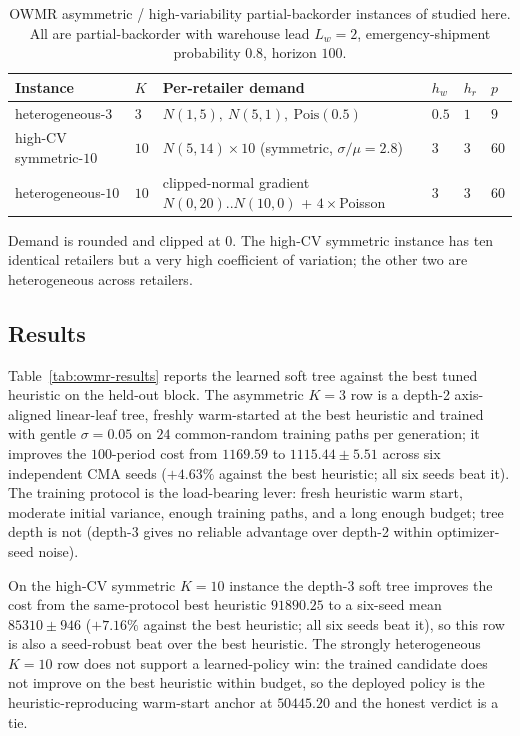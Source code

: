 \documentclass[11pt]{article}
\begin{document}
\begin{table}[!htbp]
\centering
\small
\caption{OWMR asymmetric / high-variability partial-backorder instances of \citet{kaynov2024owmr}
studied here. All are partial-backorder with warehouse lead $L_w=2$, emergency-shipment
probability $0.8$, horizon $100$.}
\label{tab:owmr-params}
\begin{tabular}{llllll}
\toprule
Instance & $K$ & Per-retailer demand & $h_w$ & $h_r$ & $p$ \\
\midrule
heterogeneous-$3$ & $3$  & $N(1,5),\ N(5,1),\ \mathrm{Pois}(0.5)$ & $0.5$ & $1$ & $9$ \\
high-CV symmetric-$10$ & $10$ & $N(5,14)\times 10$ (symmetric, $\sigma/\mu=2.8$) & $3$ & $3$ & $60$ \\
heterogeneous-$10$ & $10$ & clipped-normal gradient $N(0,20)..N(10,0)$ + $4\times$Poisson & $3$ & $3$ & $60$ \\
\bottomrule
\end{tabular}
\par\medskip\footnotesize Demand is rounded and clipped at $0$. The high-CV symmetric instance has ten
identical retailers but a very high coefficient of variation; the other two are heterogeneous across
retailers.
\end{table}
\FloatBarrier

\subsection{Results}
\label{sec:owmr-results}

Table~\ref{tab:owmr-results} reports the learned soft tree against the best tuned heuristic on the held-out
block. The asymmetric $K{=}3$ row is a depth-2 axis-aligned linear-leaf tree, freshly warm-started at the
best heuristic and trained with gentle $\sigma=0.05$ on $24$ common-random training paths per generation;
it improves the $100$-period cost from $1169.59$ to $1115.44\pm5.51$ across six independent CMA seeds
($+4.63\%$ against the best heuristic; all six seeds beat it). The training protocol is the load-bearing
lever: fresh heuristic warm start, moderate initial variance, enough training paths, and a long enough
budget; tree depth is not (depth-3 gives no reliable advantage over depth-2 within optimizer-seed noise).

On the high-CV symmetric $K{=}10$ instance the depth-3 soft tree improves the cost from the
same-protocol best heuristic $91890.25$ to a six-seed mean $85310\pm946$ ($+7.16\%$ against the best
heuristic; all six seeds beat it), so this row is also a seed-robust beat over the best heuristic. The
strongly heterogeneous $K{=}10$ row does not support a learned-policy win: the trained candidate does not
improve on the best heuristic within budget, so the deployed policy is the heuristic-reproducing
warm-start anchor at $50445.20$ and the honest verdict is a tie.
\end{document}
